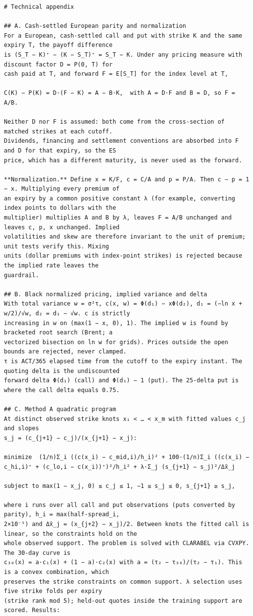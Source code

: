 \documentclass[11pt]{article}
\begin{document}
\begin{verbatim}
# Technical appendix

## A. Cash-settled European parity and normalization
For a European, cash-settled call and put with strike K and the same expiry T, the payoff difference
is (S_T − K)⁺ − (K − S_T)⁺ = S_T − K. Under any pricing measure with discount factor D = P(0, T) for
cash paid at T, and forward F = E[S_T] for the index level at T,

C(K) − P(K) = D·(F − K) = A − B·K,  with A = D·F and B = D, so F = A/B.

Neither D nor F is assumed: both come from the cross-section of matched strikes at each cutoff.
Dividends, financing and settlement conventions are absorbed into F and D for that expiry, so the ES
price, which has a different maturity, is never used as the forward.

**Normalization.** Define x = K/F, c = C/A and p = P/A. Then c − p = 1 − x. Multiplying every premium of
an expiry by a common positive constant λ (for example, converting index points to dollars with the
multiplier) multiplies A and B by λ, leaves F = A/B unchanged and leaves c, p, x unchanged. Implied
volatilities and skew are therefore invariant to the unit of premium; unit tests verify this. Mixing
units (dollar premiums with index-point strikes) is rejected because the implied rate leaves the
guardrail.

## B. Black normalized pricing, implied variance and delta
With total variance w = σ²τ, c(x, w) = Φ(d₁) − xΦ(d₂), d₁ = (−ln x + w/2)/√w, d₂ = d₁ − √w. c is strictly
increasing in w on (max(1 − x, 0), 1). The implied w is found by bracketed root search (Brent; a
vectorized bisection on ln w for grids). Prices outside the open bounds are rejected, never clamped.
τ is ACT/365 elapsed time from the cutoff to the expiry instant. The quoting delta is the undiscounted
forward delta Φ(d₁) (call) and Φ(d₁) − 1 (put). The 25-delta put is where the call delta equals 0.75.

## C. Method A quadratic program
At distinct observed strike knots x₁ < … < x_m with fitted values c_j and slopes
s_j = (c_{j+1} − c_j)/(x_{j+1} − x_j):

minimize  (1/n)Σ_i ((c(x_i) − c_mid,i)/h_i)² + 100·(1/n)Σ_i ((c(x_i) − c_hi,i)⁺ + (c_lo,i − c(x_i))⁺)²/h_i² + λ·Σ_j (s_{j+1} − s_j)²/Δx̄_j

subject to max(1 − x_j, 0) ≤ c_j ≤ 1, −1 ≤ s_j ≤ 0, s_{j+1} ≥ s_j,

where i runs over all call and put observations (puts converted by parity), h_i = max(half-spread_i,
2×10⁻⁵) and Δx̄_j = (x_{j+2} − x_j)/2. Between knots the fitted call is linear, so the constraints hold on the
whole observed support. The problem is solved with CLARABEL via CVXPY. The 30-day curve is
c₃₀(x) = a·c₁(x) + (1 − a)·c₂(x) with a = (τ₂ − τ₃₀)/(τ₂ − τ₁). This is a convex combination, which
preserves the strike constraints on common support. λ selection uses five strike folds per expiry
(strike rank mod 5); held-out quotes inside the training support are scored. Results:


\end{verbatim}
\end{document}
